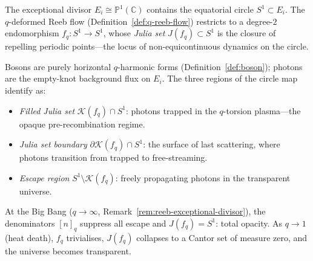 \begin{remark}
\label{rem:julia-s1-photon-scatter}
The exceptional divisor $E_i\cong\mathbb{P}^1(\mathbb{C})$ contains the equatorial circle
$S^1\subset E_i$.  The $q$-deformed Reeb flow (Definition~\ref{def:q-reeb-flow})
restricts to a degree-$2$ endomorphism $f_q\colon S^1\to S^1$, whose
\emph{Julia set} $J(f_q)\subset S^1$ is the closure of repelling periodic
points---the locus of non-equicontinuous dynamics on the circle.

Bosons are purely horizontal $q$-harmonic forms (Definition~\ref{def:boson});
photons are the empty-knot background flux on $E_i$.  The three regions of the
circle map identify as:
\begin{itemize}
  \item \emph{Filled Julia set} $\mathcal{K}(f_q)\cap S^1$: photons trapped in
        the $q$-torsion plasma---the opaque pre-recombination regime.
  \item \emph{Julia set boundary} $\partial\mathcal{K}(f_q)\cap S^1$: the
        surface of last scattering, where photons transition from trapped to
        free-streaming.
  \item \emph{Escape region} $S^1\setminus\mathcal{K}(f_q)$: freely propagating
        photons in the transparent universe.
\end{itemize}

At the Big Bang ($q\to\infty$, Remark~\ref{rem:reeb-exceptional-divisor}), the
denominators $[n]_q$ suppress all escape and $J(f_q)=S^1$: total opacity.
As $q\to 1$ (heat death), $f_q$ trivialises, $J(f_q)$ collapses to a Cantor
set of measure zero, and the universe becomes transparent.
\end{remark}
